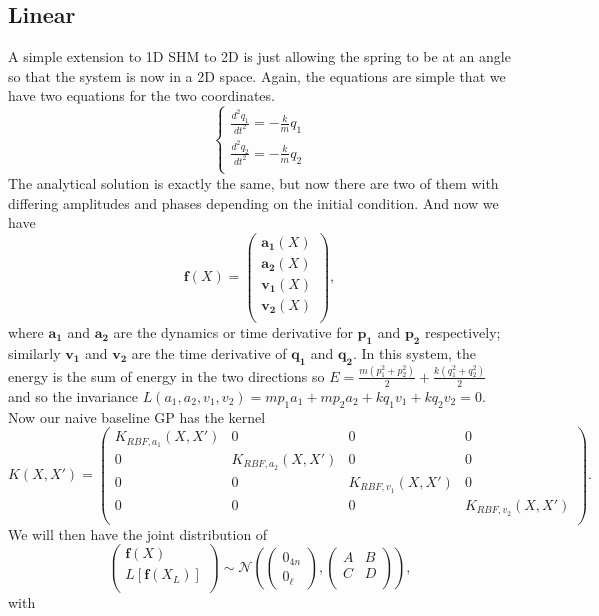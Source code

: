 \documentclass{statsmsc}
\begin{document}
\subsection{Linear}
A simple extension to 1D SHM to 2D is just allowing the spring to be at an angle so that the system is now in a 2D space.
Again, the equations are simple that we have two equations for the two coordinates.
$$
\begin{cases}
    \frac{d^2{q_1}}{dt^2} = -\frac{k}{m}q_1\\
    \frac{d^2{q_2}}{dt^2} = -\frac{k}{m}q_2\\
\end{cases}
$$
The analytical solution is exactly the same, but now there are two of them with differing amplitudes and phases depending on the initial condition. 
And now we have $$\mathbf{f}(X)=\begin{pmatrix}
    \mathbf{a_1}(X)\\
    \mathbf{a_2}(X)\\
    \mathbf{v_1}(X)\\
    \mathbf{v_2}(X)\\
\end{pmatrix},$$
where $\mathbf{a_1}$ and $\mathbf{a_2}$ are the dynamics or time derivative for $\mathbf{p_1}$ and $\mathbf{p_2}$ respectively; similarly $\mathbf{v_1}$ and $\mathbf{v_2}$ are the time derivative of $\mathbf{q_1}$ and $\mathbf{q_2}$.
In this system, the energy is the sum of energy in the two directions so $E=\frac{m(p_1^2+p_2^2)}{2}+\frac{k(q_1^2+q_2^2)}{2}$ and so the invariance $L(a_1, a_2, v_1, v_2)=mp_1a_1+mp_2a_2+kq_1v_1+kq_2v_2=0.$
Now our naive baseline GP has the kernel
$$
K(X,X')=\begin{pmatrix}
K_{RBF,a_1}(X,X') & 0 & 0 & 0 \\
0 & K_{RBF,a_2}(X,X') & 0 & 0 \\
0 & 0 & K_{RBF,v_1}(X,X') & 0 \\
0 & 0 & 0 & K_{RBF,v_2}(X,X') \\
\end{pmatrix}.
$$
We will then have the joint distribution of
$$
\begin{pmatrix}
    \mathbf{f}(X)\\L[\mathbf{f}(X_L)]\\
\end{pmatrix}
\sim\mathcal{N}
\left(
\begin{pmatrix}
    0_{4n} \\ 0_{\ell}
\end{pmatrix},
\begin{pmatrix}
    A & B \\
    C & D\\
\end{pmatrix}
\right),
$$
with 
\end{document}
